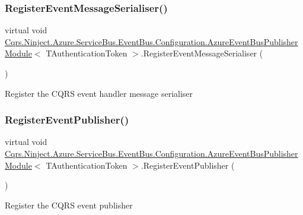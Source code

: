 \subsubsection{\texorpdfstring{Register\+Event\+Message\+Serialiser()}{RegisterEventMessageSerialiser()}}
{\footnotesize\ttfamily virtual void \hyperlink{classCqrs_1_1Ninject_1_1Azure_1_1ServiceBus_1_1EventBus_1_1Configuration_1_1AzureEventBusPublisherModule}{Cqrs.\+Ninject.\+Azure.\+Service\+Bus.\+Event\+Bus.\+Configuration.\+Azure\+Event\+Bus\+Publisher\+Module}$<$ T\+Authentication\+Token $>$.Register\+Event\+Message\+Serialiser (\begin{DoxyParamCaption}{ }\end{DoxyParamCaption})\hspace{0.3cm}{\ttfamily [virtual]}}



Register the C\+Q\+RS event handler message serialiser 

\mbox{\label{classCqrs_1_1Ninject_1_1Azure_1_1ServiceBus_1_1EventBus_1_1Configuration_1_1AzureEventBusPublisherModule_a89700c46e638c185b662b20bc938486d_a89700c46e638c185b662b20bc938486d}} 
\subsubsection{\texorpdfstring{Register\+Event\+Publisher()}{RegisterEventPublisher()}}
{\footnotesize\ttfamily virtual void \hyperlink{classCqrs_1_1Ninject_1_1Azure_1_1ServiceBus_1_1EventBus_1_1Configuration_1_1AzureEventBusPublisherModule}{Cqrs.\+Ninject.\+Azure.\+Service\+Bus.\+Event\+Bus.\+Configuration.\+Azure\+Event\+Bus\+Publisher\+Module}$<$ T\+Authentication\+Token $>$.Register\+Event\+Publisher (\begin{DoxyParamCaption}{ }\end{DoxyParamCaption})\hspace{0.3cm}{\ttfamily [virtual]}}



Register the C\+Q\+RS event publisher 

